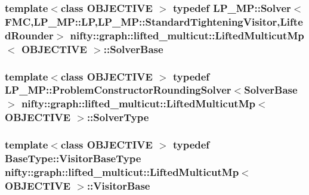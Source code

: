 \subsubsection[{Solver\+Base}]{\setlength{\rightskip}{0pt plus 5cm}template$<$class O\+B\+J\+E\+C\+T\+I\+V\+E $>$ typedef L\+P\+\_\+\+M\+P\+::\+Solver$<${\bf F\+M\+C},L\+P\+\_\+\+M\+P\+::\+L\+P,L\+P\+\_\+\+M\+P\+::\+Standard\+Tightening\+Visitor,{\bf Lifted\+Rounder}$>$ {\bf nifty\+::graph\+::lifted\+\_\+multicut\+::\+Lifted\+Multicut\+Mp}$<$ O\+B\+J\+E\+C\+T\+I\+V\+E $>$\+::{\bf Solver\+Base}}\label{classnifty_1_1graph_1_1lifted__multicut_1_1LiftedMulticutMp_af9810af21796143a4ae499e061e5f80c}
\hypertarget{classnifty_1_1graph_1_1lifted__multicut_1_1LiftedMulticutMp_a74937c2d33c809a39472710855ae7d8a}{}
\subsubsection[{Solver\+Type}]{\setlength{\rightskip}{0pt plus 5cm}template$<$class O\+B\+J\+E\+C\+T\+I\+V\+E $>$ typedef L\+P\+\_\+\+M\+P\+::\+Problem\+Constructor\+Rounding\+Solver$<${\bf Solver\+Base}$>$ {\bf nifty\+::graph\+::lifted\+\_\+multicut\+::\+Lifted\+Multicut\+Mp}$<$ O\+B\+J\+E\+C\+T\+I\+V\+E $>$\+::{\bf Solver\+Type}}\label{classnifty_1_1graph_1_1lifted__multicut_1_1LiftedMulticutMp_a74937c2d33c809a39472710855ae7d8a}
\hypertarget{classnifty_1_1graph_1_1lifted__multicut_1_1LiftedMulticutMp_aafe286a57ff4bda8e0c50a00a98c3b32}{}
\subsubsection[{Visitor\+Base}]{\setlength{\rightskip}{0pt plus 5cm}template$<$class O\+B\+J\+E\+C\+T\+I\+V\+E $>$ typedef {\bf Base\+Type\+::\+Visitor\+Base\+Type} {\bf nifty\+::graph\+::lifted\+\_\+multicut\+::\+Lifted\+Multicut\+Mp}$<$ O\+B\+J\+E\+C\+T\+I\+V\+E $>$\+::{\bf Visitor\+Base}}\label{classnifty_1_1graph_1_1lifted__multicut_1_1LiftedMulticutMp_aafe286a57ff4bda8e0c50a00a98c3b32}
\hypertarget{classnifty_1_1graph_1_1lifted__multicut_1_1LiftedMulticutMp_a626d90e31497d790dd454961ce179d8a}{}
